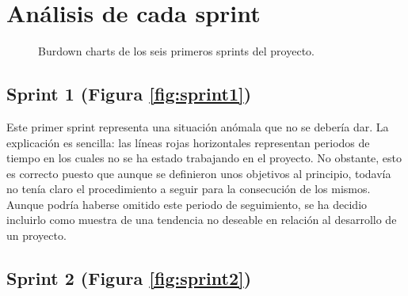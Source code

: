 \section{Análisis de cada sprint}

\begin{figure}[H]
\centering
{}\qquad
{}\qquad
{}\qquad
{}\qquad
{}\qquad
{}
\caption{Burdown charts de los seis primeros sprints del proyecto.}
\label{fig:sprints1-6}
\end{figure}

\subsection{Sprint 1 (Figura \ref{fig:sprint1})}

Este primer sprint representa una situación anómala que no se debería dar. La explicación es sencilla: las líneas rojas horizontales representan periodos de tiempo en los cuales no se ha estado trabajando en el proyecto. No obstante, esto es correcto puesto que aunque se definieron unos objetivos al principio, todavía no tenía claro el procedimiento a seguir para la consecución de los mismos. Aunque podría haberse omitido este periodo de seguimiento, se ha decidio incluirlo como muestra de una tendencia no deseable en relación al desarrollo de un proyecto.

\subsection{Sprint 2 (Figura \ref{fig:sprint2})}

